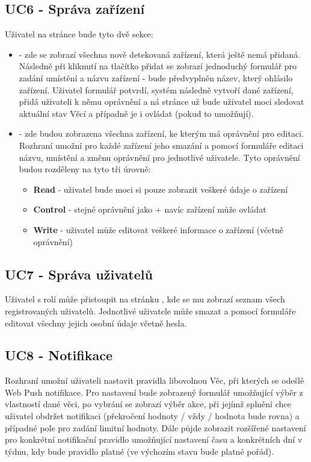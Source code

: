 \subsection{UC6 - Správa zařízení}
Uživatel na stránce  bude tyto dvě sekce:
\begin{itemize}
    \item {} - zde se zobrazí všechna nově detekovaná zařízení, která ještě nemá přidaná. Následně při kliknutí na tlačítko přidat se zobrazí jednoduchý formulář pro zadání umístění a názvu zařízení - bude předvyplněn název, který ohlásilo zařízení. Uživatel formulář potvrdí, systém následně vytvoří dané zařízení, přidá uživateli k němu oprávnění a ná stránce  už bude uživatel moci sledovat aktuální stav Věcí a případně je i ovládat (pokud to umožňují).
    \item  {} - zde budou zobrazena všechna zařízení, ke kterým má oprávnění pro editaci. Rozhraní umožní pro každé zařízení jeho smazání a pomocí formuláře editaci názvu, umístění a změnu oprávnění pro jednotlivé uživatele. Tyto oprávnění budou rozděleny na tyto tři úrovně:
          \begin{itemize}
              \item \textbf{Read} - uživatel bude moci si pouze zobrazit veškeré údaje o zařízení
              \item \textbf{Control} - stejné oprávnění jako  + navíc zařízení může ovládat
              \item \textbf{Write} - uživatel může editovat veškeré informace o zařízení (včetně oprávnění)
          \end{itemize}
\end{itemize}

\subsection{UC7 - Správa uživatelů}
Uživatel s rolí  může přistoupit na stránku , kde se mu zobrazí seznam všech registrovaných uživatelů. Jednotlivé uživatele může smazat a pomocí formuláře editovat všechny jejich osobní údaje včetně hesla.

\subsection{UC8 - Notifikace}
Rozhraní umožní uživateli nastavit pravidla libovolnou Věc, při kterých se odešlě Web Push notifikace. Pro nastavení bude zobrazený formulář umožňující výběr z vlastností dané věci, po vybrání se zobrazí výběr akce, při jejímž splnění chce uživatel obdržet notifikaci (překročení hodnoty / vždy / hodnota bude rovna) a případné pole pro zadání limitní hodnoty. Dále půjde zobrazit rozšířené nastavení pro konkrétní notifikační pravidlo umožňující nastavení času a konkrétních dní v týdnu, kdy bude pravidlo platné (ve výchozím stavu bude platné pořád).

